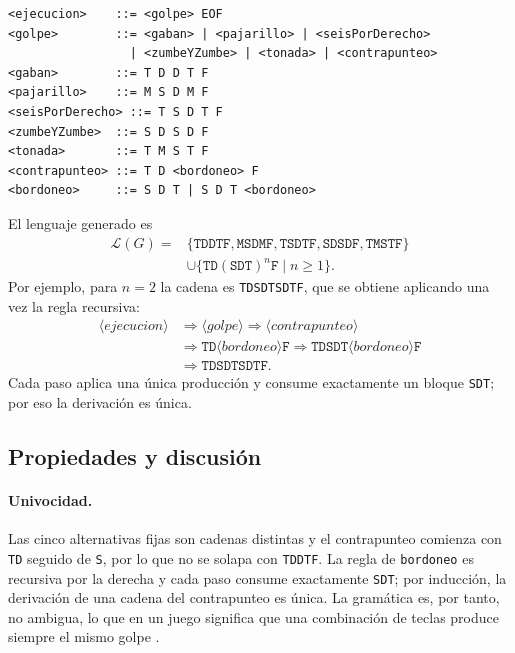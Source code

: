 \documentclass[9pt]{ieeeconf}
\newcommand{\Lang}{\mathcal{L}}
\newcommand{\tk}[1]{\texttt{#1}}
\begin{document}
\begin{lstlisting}
<ejecucion>    ::= <golpe> EOF
<golpe>        ::= <gaban> | <pajarillo> | <seisPorDerecho>
                 | <zumbeYZumbe> | <tonada> | <contrapunteo>
<gaban>        ::= T D D T F
<pajarillo>    ::= M S D M F
<seisPorDerecho> ::= T S D T F
<zumbeYZumbe>  ::= S D S D F
<tonada>       ::= T M S T F
<contrapunteo> ::= T D <bordoneo> F
<bordoneo>     ::= S D T | S D T <bordoneo>
\end{lstlisting}

El lenguaje generado es
\begin{equation}
  \begin{aligned}
    \Lang(G) = {} & \{\tk{TDDTF},\tk{MSDMF},\tk{TSDTF},\tk{SDSDF},\tk{TMSTF}\}\\
    & \cup \{\tk{TD}(\tk{SDT})^n\tk{F}\mid n\ge 1\}.
  \end{aligned}
  \label{eq:lenguaje-juego}
\end{equation}
Por ejemplo, para $n=2$ la cadena es \tk{TDSDTSDTF}, que se obtiene aplicando una vez la regla recursiva:
\begin{equation}
\begin{aligned}
  \langle ejecucion\rangle
  &\Rightarrow \langle golpe\rangle
  \Rightarrow \langle contrapunteo\rangle\\
  &\Rightarrow \tk{TD}\langle bordoneo\rangle\tk{F}
  \Rightarrow \tk{TDSDT}\langle bordoneo\rangle\tk{F}\\
  &\Rightarrow \tk{TDSDTSDTF}.
\end{aligned}
\label{eq:derivacion}
\end{equation}
Cada paso aplica una única producción y consume exactamente un bloque \tk{SDT}; por eso la derivación es única.

\subsection{Propiedades y discusión}
\label{sec:propiedades}

\paragraph{Univocidad.} Las cinco alternativas fijas son cadenas distintas y el contrapunteo comienza con \tk{TD} seguido de \tk{S}, por lo que no se solapa con \tk{TDDTF}. La regla de \texttt{bordoneo} es recursiva por la derecha y cada paso consume exactamente \tk{SDT}; por inducción, la derivación de una cadena del contrapunteo es única. La gramática es, por tanto, no ambigua, lo que en un juego significa que una combinación de teclas produce siempre el mismo golpe \cite{hopcroft2006}.
\end{document}
